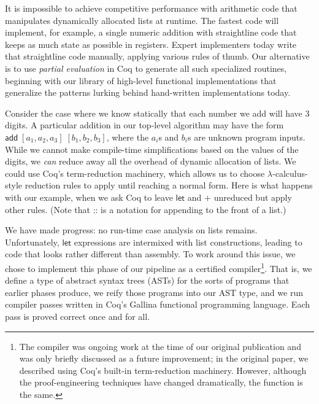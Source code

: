 \documentclass[letterpaper,twocolumn,10pt]{article}
\newcommand{\kw}[1]{\mathsf{#1}}
\newcommand{\id}[1]{\bm{\mathsf{#1}}}
\begin{document}
It is impossible to achieve competitive performance with arithmetic code that manipulates dynamically allocated lists at runtime.
The fastest code will implement, for example, a single numeric addition with straightline code that keeps as much state as possible in registers.
Expert implementers today write that straightline code manually, applying various rules of thumb.
Our alternative is to use \emph{partial evaluation} in Coq to generate all such specialized routines, beginning with our library of high-level functional implementations that generalize the patterns lurking behind hand-written implementations today.

Consider the case where we know statically that each number we add will have 3 digits.
A particular addition in our top-level algorithm may have the form $\id{add} \; [a_1, a_2, a_3] \; [b_1, b_2, b_3]$, where the $a_i$s and $b_i$s are unknown program inputs.
While we cannot make compile-time simplifications based on the values of the digits, we \emph{can} reduce away all the overhead of dynamic allocation of lists.
We could use Coq's term-reduction machinery, which allows us to choose $\lambda$-calculus-style reduction rules to apply until reaching a normal form.
Here is what happens with our example, when we ask Coq to leave $\kw{let}$ and $+$ unreduced but apply other rules.
(Note that :: is a notation for appending to the front of a list.)

\noindent {\small \begin{eqnarray*}
  \id{add} \; [a_1, a_2, a_3] \; [b_1, b_2, b_3] &\Downarrow& \kw{let} \; n_1 = a_1 + b_1 \; \kw{in} \; n_1 :: \\
  && \kw{let} \; n_2 = a_2 + b_2 \; \kw{in} \; n_2 :: \\
  && \kw{let} \; n_3 = a_3 + b_3 \; \kw{in} \; n_3 :: []
\end{eqnarray*}}%

\noindent We have made progress: no run-time case analysis on lists remains.
Unfortunately, $\kw{let}$ expressions are intermixed with list constructions, leading to code that looks rather different than assembly.
To work around this issue, we chose to implement this phase of our pipeline as a certified compiler\footnote{The compiler was ongoing work at the time of our original publication and was only briefly discussed as a future improvement; in the original paper, we described using Coq's built-in term-reduction machinery.
However, although the proof-engineering techniques have changed dramatically, the function is the same.
}.
That is, we define a type of abstract syntax trees (ASTs) for the sorts of programs that earlier phases produce, we reify those programs into our AST type, and we run compiler passes written in Coq's Gallina functional programming language.
Each pass is proved correct once and for all.
\end{document}
